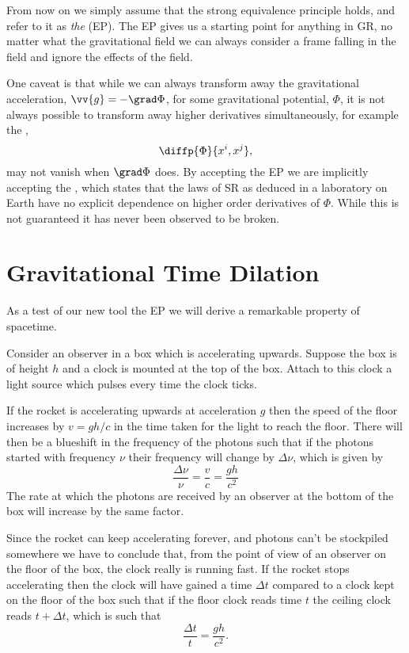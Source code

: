 \documentclass[fleqn]{NotesClass}
\begin{document}
    From now on we simply assume that the strong equivalence principle holds, and refer to it as \emph{the}  (EP).
    The EP gives us a starting point for anything in GR, no matter what the gravitational field we can always consider a frame falling in the field and ignore the effects of the field.
    
    One caveat is that while we can always transform away the gravitational acceleration, \(\vv{g} = -\grad\Phi\), for some gravitational potential, \(\Phi\), it is not always possible to transform away higher derivatives simultaneously, for example the ,
    \begin{equation}
        \diffp{\Phi}{x^i, x^j},
    \end{equation}
    may not vanish when \(\grad\Phi\) does.
    By accepting the EP we are implicitly accepting the , which states that the laws of SR as deduced in a laboratory on Earth have no explicit dependence on higher order derivatives of \(\Phi\).
    While this is not guaranteed it has never been observed to be broken.
    
    \section{Gravitational Time Dilation}\label{sec:gravitational time dilation}
    As a test of our new tool the EP we will derive a remarkable property of spacetime.
    
    Consider an observer in a box which is accelerating upwards.
    Suppose the box is of height \(h\) and a clock is mounted at the top of the box.
    Attach to this clock a light source which pulses every time the clock ticks.
    
    If the rocket is accelerating upwards at acceleration \(g\) then the speed of the floor increases by \(v = gh/c\) in the time taken for the light to reach the floor.
    There will then be a blueshift in the frequency of the photons such that if the photons started with frequency \(\nu\) their frequency will change by \(\Delta \nu\), which is given by
    \begin{equation}
        \frac{\Delta \nu}{\nu} = \frac{v}{c} = \frac{gh}{c^2}
    \end{equation}
    The rate at which the photons are received by an observer at the bottom of the box will increase by the same factor.
    
    Since the rocket can keep accelerating forever, and photons can't be stockpiled somewhere we have to conclude that, from the point of view of an observer on the floor of the box, the clock really is running fast.
    If the rocket stops accelerating then the clock will have gained a time \(\Delta t\) compared to a clock kept on the floor of the box such that if the floor clock reads time \(t\) the ceiling clock reads \(t + \Delta t\), which is such that
    \begin{equation}
        \frac{\Delta t}{t} = \frac{gh}{c^2}.
    \end{equation}
    
\end{document}
